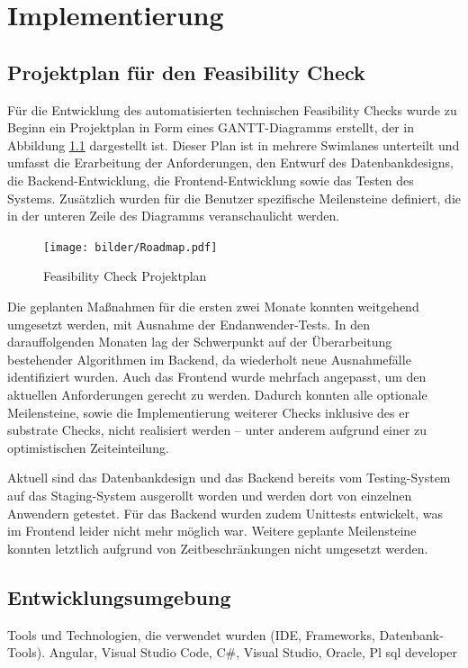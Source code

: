 \chapter{Implementierung}\label{Chap:Implementierung}

\section{Projektplan für den Feasibility Check}
Für die Entwicklung des automatisierten technischen Feasibility Checks wurde zu Beginn ein Projektplan in Form eines GANTT-Diagramms erstellt, der in Abbildung \ref{fig:roadmap} dargestellt ist. Dieser Plan ist in mehrere Swimlanes unterteilt und umfasst die Erarbeitung der Anforderungen, den Entwurf des Datenbankdesigns, die Backend-Entwicklung, die Frontend-Entwicklung sowie das Testen des Systems. Zusätzlich wurden für die Benutzer spezifische Meilensteine definiert, die in der unteren Zeile des Diagramms veranschaulicht werden.

\begin{figure}[!htbp]
    \centering
    \texttt{[image: bilder/Roadmap.pdf]}
    \caption{Feasibility Check Projektplan}
    \label{fig:roadmap}
\end{figure}

Die geplanten Maßnahmen für die ersten zwei Monate konnten weitgehend umgesetzt werden, mit Ausnahme der Endanwender-Tests. In den darauffolgenden Monaten lag der Schwerpunkt auf der Überarbeitung bestehender Algorithmen im Backend, da wiederholt neue Ausnahmefälle identifiziert wurden. Auch das Frontend wurde mehrfach angepasst, um den aktuellen Anforderungen gerecht zu werden. Dadurch konnten alle optionale Meilensteine, sowie die Implementierung weiterer Checks inklusive des er \gls{substrate} Checks, nicht realisiert werden – unter anderem aufgrund einer zu optimistischen Zeiteinteilung.

Aktuell sind das Datenbankdesign und das Backend bereits vom Testing-System auf das Staging-System ausgerollt worden und werden dort von einzelnen Anwendern getestet. Für das Backend wurden zudem Unittests entwickelt, was im Frontend leider nicht mehr möglich war. Weitere geplante Meilensteine konnten letztlich aufgrund von Zeitbeschränkungen nicht umgesetzt werden.


\section{Entwicklungsumgebung}
Tools und Technologien, die verwendet wurden (IDE, Frameworks, Datenbank-Tools).
Angular, Visual Studio Code, 
C\#, Visual Studio,
Oracle, Pl sql developer

